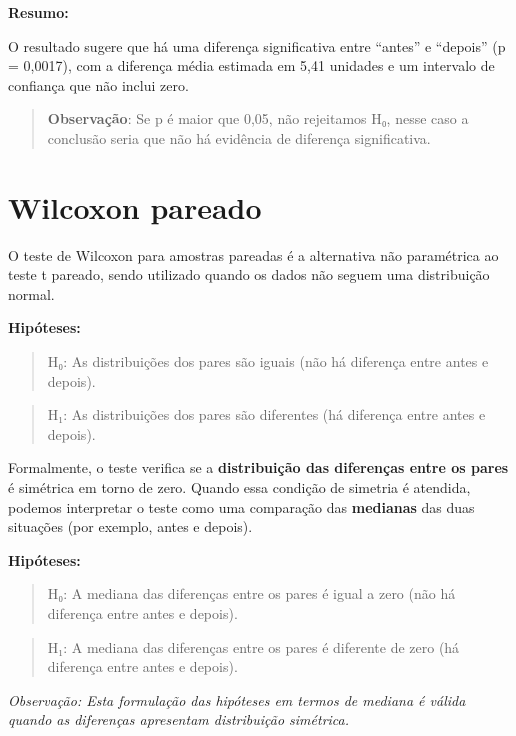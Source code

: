 \documentclass[
]{book}
\begin{document}
\textbf{Resumo:}

O resultado sugere que há uma diferença significativa entre ``antes'' e ``depois'' (p = 0,0017), com a diferença média estimada em 5,41 unidades e um intervalo de confiança que não inclui zero.

\begin{quote}
\textbf{Observação}: Se p é maior que 0,05, não rejeitamos H₀, nesse caso a conclusão seria que não há evidência de diferença significativa.
\end{quote}

\section{Wilcoxon pareado}\label{wilcoxon-pareado}

O teste de Wilcoxon para amostras pareadas é a alternativa não paramétrica ao teste t pareado, sendo utilizado quando os dados não seguem uma distribuição normal.

\textbf{Hipóteses:}

\begin{quote}
H₀: As distribuições dos pares são iguais (não há diferença entre antes e depois).
\end{quote}

\begin{quote}
H₁: As distribuições dos pares são diferentes (há diferença entre antes e depois).
\end{quote}

Formalmente, o teste verifica se a \textbf{distribuição das diferenças entre os pares} é simétrica em torno de zero. Quando essa condição de simetria é atendida, podemos interpretar o teste como uma comparação das \textbf{medianas} das duas situações (por exemplo, antes e depois).

\textbf{Hipóteses:}

\begin{quote}
H₀: A mediana das diferenças entre os pares é igual a zero (não há diferença entre antes e depois).
\end{quote}

\begin{quote}
H₁: A mediana das diferenças entre os pares é diferente de zero (há diferença entre antes e depois).
\end{quote}

\emph{Observação: Esta formulação das hipóteses em termos de mediana é válida quando as diferenças apresentam distribuição simétrica.}
\end{document}
